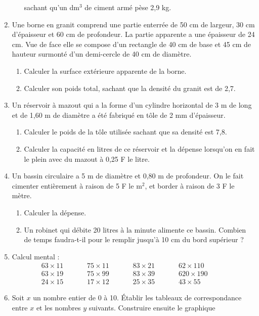 \begin{enumerate}
\begin{enumerate}
sachant qu'un dm${}^3$ de ciment armé pèse 2,9 kg. 
\end{enumerate}
\item Une borne en granit comprend une partie enterrée de 50 cm de largeur, 30 cm d'épaisseur et 60 cm de 
profondeur. La partie apparente a une épaisseur de 24 cm. Vue de face elle se compose d'un rectangle de 40
cm de base et 45 cm de hauteur surmonté d'un demi-cercle de 40 cm de diamètre. \begin{enumerate}
\item Calculer la surface extérieure apparente de 
la borne. 
\item Calculer son poids total, sachant que la densité 
du granit est de 2,7. 
\end{enumerate}
\item Un réservoir à mazout qui a la forme d'un cylindre horizontal de 3 m de long et de 1,60 m de 
diamètre a été fabriqué en tôle de 2 mm d'épaisseur.
\begin{enumerate}
\item Calculer le poids de la tôle utilisée sachant que sa densité est 7,8. 
\item Calculer la capacité en litres de ce réservoir et la dépense lorsqu'on en fait le plein avec du 
mazout à 0,25 F le litre. 
\end{enumerate}
\item Un bassin circulaire a 5 m de diamètre et 0,80 m 
de profondeur. On le fait cimenter entièrement à raison de 5 F le m${}^2$, et border à raison de 3 F le
mètre.\begin{enumerate}
\item Calculer la dépense. 
\item Un robinet qui débite 20 litres à la minute 
alimente ce bassin. Combien de temps faudra-t-il pour le remplir jusqu'à 10 cm du bord supérieur ? 
\end{enumerate}
\item Calcul mental : 
\[\begin{matrix}
63 \times 11 \phantom{meow}& 75 \times 11\phantom{meow} & 83 \times 21\phantom{meow} & 62 \times
 110\phantom{meow} \\
 63 \times 19 \phantom{meow}& 75 \times 99 \phantom{meow}& 83 \times 39 \phantom{meow}& 620 \times 190\phantom{meow}\\
 24 \times 15 \phantom{meow}& 17 \times 12 \phantom{meow}& 25 \times 35 \phantom{meow}& 43 \times 55 \phantom{meow}
 \end{matrix}\]
 \item Soit $x$ un nombre entier de 0 à 10. Établir les tableaux de correspondance entre $x$ et les nombres $y$ suivants. Construire ensuite le graphique 

\end{enumerate}
